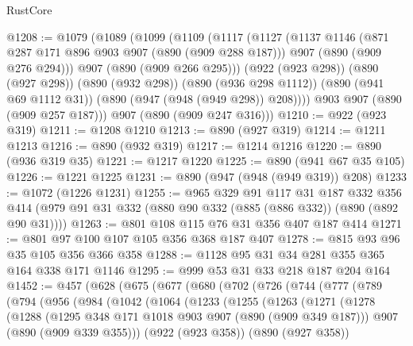 \begin{lexlean}{RustCore}
\begin{coremodule}
@1208 := @1079
    (@1089
      (@1099
        (@1109
          (@1117
            (@1127
              (@1137
                @1146
                (@871 @287 @171 @896 @903 @907 (@890 (@909 @288 @187)))
                @907
                (@890 (@909 @276 @294)))
              @907
              (@890 (@909 @266 @295)))
            (@922 (@923 @298))
            (@890 (@927 @298))
            (@890 (@932 @298))
            (@890 (@936 @298 @1112))
            (@890 (@941 @69 @1112 @31))
            (@890 (@947 (@948 (@949 @298)) @208))))
        @903
        @907
        (@890 (@909 @257 @187)))
      @907
      (@890 (@909 @247 @316)))
@1210 := @922 (@923 @319)
@1211 := @1208 @1210
@1213 := @890 (@927 @319)
@1214 := @1211 @1213
@1216 := @890 (@932 @319)
@1217 := @1214 @1216
@1220 := @890 (@936 @319 @35)
@1221 := @1217 @1220
@1225 := @890 (@941 @67 @35 @105)
@1226 := @1221 @1225
@1231 := @890 (@947 (@948 (@949 @319)) @208)
@1233 := @1072 (@1226 @1231)
@1255 := @965
    @329
    @91
    @117
    @31
    @187
    @332
    @356
    @414
    (@979 @91 @31 @332 (@880 @90 @332 (@885 (@886 @332)) (@890 (@892 @90 @31))))
@1263 := @801 @108 @115 @76 @31 @356 @407 @187 @414
@1271 := @801 @97 @100 @107 @105 @356 @368 @187 @407
@1278 := @815 @93 @96 @35 @105 @356 @366 @358
@1288 := @1128 @95 @31 @34 @281 @355 @365 @164 @338 @171 @1146
@1295 := @999 @53 @31 @33 @218 @187 @204 @164
@1452 := @457
    (@628
      (@675
        (@677
          (@680
            (@702
              (@726
                (@744
                  (@777
                    (@789
                      (@794
                        (@956
                          (@984
                            (@1042
                              (@1064
                                (@1233
                                  (@1255
                                    (@1263
                                      (@1271
                                        (@1278
                                          (@1288
                                            (@1295
                                              @348
                                              @171
                                              @1018
                                              @903
                                              @907
                                              (@890 (@909 @349 @187)))
                                            @907
                                            (@890 (@909 @339 @355)))
                                          (@922 (@923 @358))
                                          (@890 (@927 @358))

\end{coremodule}
\end{lexlean}
